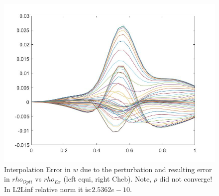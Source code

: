 \documentclass[11pt, a4paper]{article}
\theoremstyle{definition}
\begin{document}
\begin{figure}[h]
		\includegraphics[scale=0.25]{ErrrhoPert2b.jpg}
		\caption{Interpolation Error in $w$ due to the perturbation and resulting error in $rho_{Opti}$ vs $rho_{Ex}$ (left equi, right Cheb). Note, $\rho$ did not converge! In L2Linf relative norm it is:$2.5362e-10$. }
		\label{Pert1}
	\end{figure}
\end{document}
